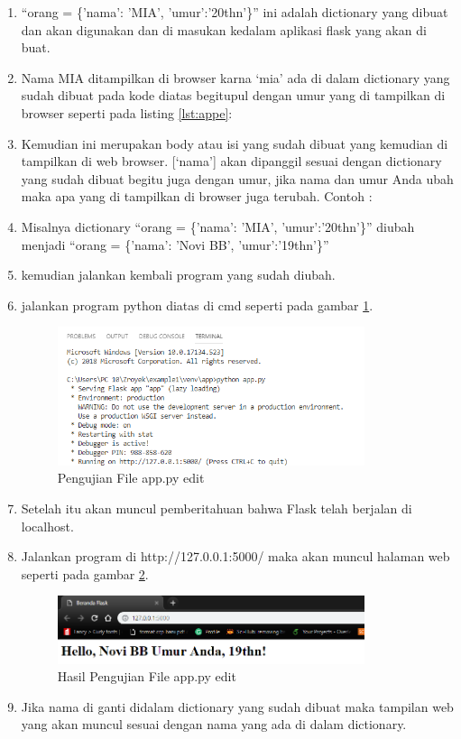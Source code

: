 \begin{enumerate}
\item “orang = \{'nama': 'MIA', 'umur':'20thn'\}” ini adalah dictionary yang dibuat dan akan digunakan dan di masukan kedalam aplikasi flask yang akan di buat.
\item Nama MIA ditampilkan di browser karna ‘mia’ ada di dalam dictionary yang sudah dibuat pada kode diatas begitupul dengan umur yang di tampilkan di browser seperti pada listing \ref{lst:appe}:


\item Kemudian ini merupakan body atau isi yang sudah dibuat yang kemudian di tampilkan di web browser. [‘nama’] akan dipanggil sesuai dengan dictionary yang sudah dibuat begitu juga dengan umur, jika nama dan umur  Anda ubah maka apa yang di tampilkan di browser juga terubah.
Contoh :
\item Misalnya dictionary “orang = \{'nama': 'MIA', 'umur':'20thn'\}” diubah menjadi 
“orang = \{'nama': 'Novi BB', 'umur':'19thn'\}”
 \item kemudian jalankan kembali program yang sudah diubah.
\item jalankan program python diatas di cmd seperti pada gambar \ref{fig:pae}.
\begin{figure}[!htbp]
	\centerline{\includegraphics[width=0.85\textwidth]{figures/13/pae.PNG}}
	\caption{Pengujian File app.py edit}
	\label{fig:pae}
\end{figure}

\item Setelah itu akan muncul pemberitahuan bahwa Flask telah berjalan di localhost.
\item Jalankan program di http://127.0.0.1:5000/ maka akan muncul halaman web seperti pada gambar \ref{fig:hpae}.
\begin{figure}[!htbp]
	\centerline{\includegraphics[width=0.85\textwidth]{figures/13/hpae.PNG}}
	\caption{Hasil Pengujian File app.py edit}
	\label{fig:hpae}
\end{figure}

\item Jika nama di ganti didalam dictionary yang sudah dibuat maka tampilan web yang akan muncul sesuai dengan nama yang ada di dalam dictionary.
\end{enumerate}

